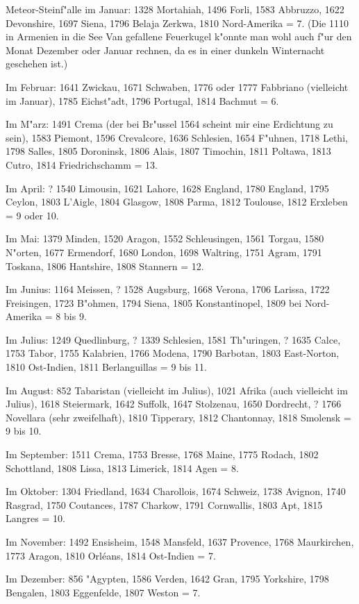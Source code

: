\documentclass[a4paper, 11pt, oneside, polutonikogreek, german]{article}
\begin{document}
Meteor-Steinf"alle im Januar: 1328 Mortahiah, 1496 Forli, 1583 Abbruzzo, 1622 Devonshire, 1697 Siena, 1796 Belaja Zerkwa, 1810 Nord-Amerika = 7. (Die 1110 in Armenien in die See Van gefallene Feuerkugel k"onnte man wohl auch f"ur den Monat Dezember oder Januar rechnen, da es in einer dunkeln Winternacht geschehen ist.)

Im Februar: 1641 Zwickau, 1671 Schwaben, 1776 oder 1777 Fabbriano (vielleicht im Januar), 1785 Eichst"adt, 1796 Portugal, 1814 Bachmut = 6.

Im M"arz: 1491 Crema (der bei Br"ussel 1564 scheint mir eine Erdichtung zu sein), 1583 Piemont, 1596 Crevalcore, 1636 Schlesien, 1654 F"uhnen, 1718 Lethi, 1798 Salles, 1805 Doroninsk, 1806 Alais, 1807 Timochin, 1811 Poltawa, 1813 Cutro, 1814 Friedrichschamm = 13.

Im April: ? 1540 Limousin, 1621 Lahore, 1628 England, 1780 England, 1795 Ceylon, 1803 L'Aigle, 1804 Glasgow, 1808 Parma, 1812 Toulouse, 1812 Erxleben = 9 oder 10.

Im Mai: 1379 Minden, 1520 Aragon, 1552 Schleusingen, 1561 Torgau, 1580 N"orten, 1677 Ermendorf, 1680 London, 1698 Waltring, 1751 Agram, 1791 Toskana, 1806 Hantshire, 1808 Stannern = 12.

Im Junius: 1164 Meissen, ? 1528 Augsburg, 1668 Verona, 1706 Larissa, 1722 Freisingen, 1723 B"ohmen, 1794 Siena, 1805 Konstantinopel, 1809 bei Nord-Amerika = 8 bis 9.

Im Julius: 1249 Quedlinburg, ? 1339 Schlesien, 1581 Th"uringen, ? 1635 Calce, 1753 Tabor, 1755 Kalabrien, 1766 Modena, 1790 Barbotan, 1803 East-Norton, 1810 Ost-Indien, 1811 Berlanguillas = 9 bis 11.

Im August: 852 Tabaristan (vielleicht im Julius), 1021 Afrika (auch vielleicht im Julius), 1618 Steiermark, 1642 Suffolk, 1647 Stolzenau, 1650 Dordrecht, ? 1766 Novellara (sehr zweifelhaft), 1810 Tipperary, 1812 Chantonnay, 1818 Smolensk = 9 bis 10.

Im September: 1511 Crema, 1753 Bresse, 1768 Maine, 1775 Rodach, 1802 Schottland, 1808 Lissa, 1813 Limerick, 1814 Agen = 8.

Im Oktober: 1304 Friedland, 1634 Charollois, 1674 Schweiz, 1738 Avignon, 1740 Rasgrad, 1750 Coutances, 1787 Charkow, 1791 Cornwallis, 1803 Apt, 1815 Langres = 10.

Im November: 1492 Ensisheim, 1548 Mansfeld, 1637 Provence, 1768 Maurkirchen, 1773 Aragon, 1810 Orléans, 1814 Ost-Indien = 7.

Im Dezember: 856 "Agypten, 1586 Verden, 1642 Gran, 1795 Yorkshire, 1798 Bengalen, 1803 Eggenfelde, 1807 Weston = 7.
\end{document}
